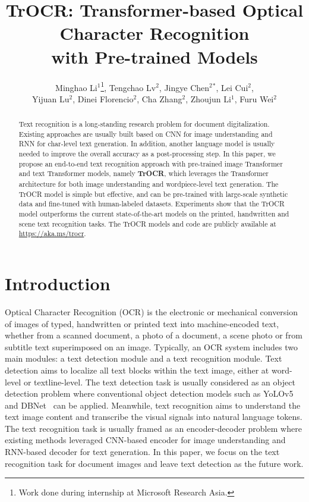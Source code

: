 \documentclass[letterpaper]{article} \usepackage{aaai23}  \usepackage{times}  \usepackage{helvet}  \usepackage{courier}  \usepackage[hyphens]{url}  \usepackage{graphicx} \urlstyle{rm} \def\UrlFont{\rm}  \usepackage{natbib}  \usepackage{caption} \frenchspacing  \setlength{\pdfpagewidth}{8.5in} \setlength{\pdfpageheight}{11in} \usepackage{algorithm}
\title{TrOCR: Transformer-based Optical Character Recognition\\ with Pre-trained Models}
\author{Minghao Li$^{1}$\thanks{Work done during internship at Microsoft Research Asia.}, Tengchao Lv$^{2}$, Jingye Chen$^{2}$$^{*}$, Lei Cui$^{2}$, \\
Yijuan Lu$^{2}$, Dinei Florencio$^{2}$, Cha Zhang$^{2}$, Zhoujun Li$^{1}$, Furu Wei$^{2}$}
\begin{document}
\maketitle

\begin{abstract}
Text recognition is a long-standing research problem for document digitalization. Existing approaches are usually built based on CNN for image understanding and RNN for char-level text generation. In addition, another language model is usually needed to improve the overall accuracy as a post-processing step. In this paper, we propose an end-to-end text recognition approach with pre-trained image Transformer and text Transformer models, namely \textbf{TrOCR}, which leverages the Transformer architecture for both image understanding and wordpiece-level text generation. The TrOCR model is simple but effective, and can be pre-trained with large-scale synthetic data and fine-tuned with human-labeled datasets. Experiments show that the TrOCR model outperforms the current state-of-the-art models on the printed, handwritten and scene text recognition tasks. The TrOCR models and code are publicly available at \url{https://aka.ms/trocr}.
\end{abstract}

\section{Introduction}

Optical Character Recognition (OCR) is the electronic or mechanical conversion of images of typed, handwritten or printed text into machine-encoded text, whether from a scanned document, a photo of a document, a scene photo or from subtitle text superimposed on an image. Typically, an OCR system includes two main modules: a text detection module and a text recognition module. Text detection aims to localize all text blocks within the text image, either at word-level or textline-level. The text detection task is usually considered as an object detection problem where conventional object detection models such as YoLOv5 and DBNet~\cite{liao2019realtime} can be applied. Meanwhile, text recognition aims to understand the text image content and transcribe the visual signals into natural language tokens. The text recognition task is usually framed as an encoder-decoder problem where existing methods leveraged CNN-based encoder for image understanding and RNN-based decoder for text generation. In this paper, we focus on the text recognition task for document images and leave text detection as the future work.
\end{document}
